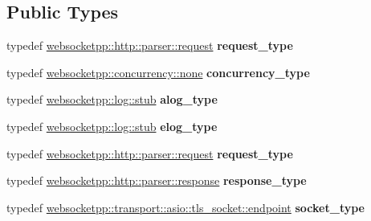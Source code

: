 \subsection*{Public Types}
\begin{DoxyCompactItemize}
\item 
typedef \hyperlink{classwebsocketpp_1_1http_1_1parser_1_1request}{websocketpp\+::http\+::parser\+::request} {\bfseries request\+\_\+type}\hypertarget{classconfig_a47084e20c1e8e92efda01afebcf40fb1}{}\label{classconfig_a47084e20c1e8e92efda01afebcf40fb1}

\item 
typedef \hyperlink{classwebsocketpp_1_1concurrency_1_1none}{websocketpp\+::concurrency\+::none} {\bfseries concurrency\+\_\+type}\hypertarget{classconfig_a33b44b41c443ce5557d8ba0dc9f9586d}{}\label{classconfig_a33b44b41c443ce5557d8ba0dc9f9586d}

\item 
typedef \hyperlink{classwebsocketpp_1_1log_1_1stub}{websocketpp\+::log\+::stub} {\bfseries alog\+\_\+type}\hypertarget{classconfig_a2fbf18cfbc2acb193641dd978b7c5a8b}{}\label{classconfig_a2fbf18cfbc2acb193641dd978b7c5a8b}

\item 
typedef \hyperlink{classwebsocketpp_1_1log_1_1stub}{websocketpp\+::log\+::stub} {\bfseries elog\+\_\+type}\hypertarget{classconfig_ad075aec76360e88692914488f384f27c}{}\label{classconfig_ad075aec76360e88692914488f384f27c}

\item 
typedef \hyperlink{classwebsocketpp_1_1http_1_1parser_1_1request}{websocketpp\+::http\+::parser\+::request} {\bfseries request\+\_\+type}\hypertarget{classconfig_a47084e20c1e8e92efda01afebcf40fb1}{}\label{classconfig_a47084e20c1e8e92efda01afebcf40fb1}

\item 
typedef \hyperlink{classwebsocketpp_1_1http_1_1parser_1_1response}{websocketpp\+::http\+::parser\+::response} {\bfseries response\+\_\+type}\hypertarget{classconfig_a4896c7ce43482f4ec0347911fd414a56}{}\label{classconfig_a4896c7ce43482f4ec0347911fd414a56}

\item 
typedef \hyperlink{classwebsocketpp_1_1transport_1_1asio_1_1tls__socket_1_1endpoint}{websocketpp\+::transport\+::asio\+::tls\+\_\+socket\+::endpoint} {\bfseries socket\+\_\+type}\hypertarget{classconfig_aeacabf00ba9ded7364aa0508f91a3b20}{}\label{classconfig_aeacabf00ba9ded7364aa0508f91a3b20}


\end{DoxyCompactItemize}
